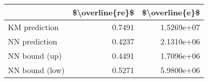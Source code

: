 \begin{tabular}{lrr}
\toprule
{} &  \$\textbackslash overline\{re\}\$ &  \$\textbackslash overline\{e\}\$ \\
\midrule
KM prediction  &           0.7491 &      1.5269e+07 \\
NN prediction  &           0.4237 &      2.1310e+06 \\
NN bound (up)  &           0.4491 &      1.7096e+06 \\
NN bound (low) &           0.5271 &      5.9800e+06 \\
\bottomrule
\end{tabular}
